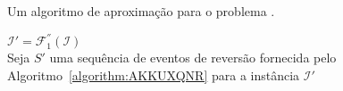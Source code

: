 \begin{algorithm}[!tbh]
  \caption{Um algoritmo de aproximação para o problema \SbFIR{}.\label{algorithm:BSOTINLZ}}
  $\mathcal{I}' = \mathcal{F}_{1}^{''}(\mathcal{I})$ \\
  Seja $S'$ uma sequência de eventos de reversão fornecida pelo Algoritmo~\ref{algorithm:AKKUXQNR} para a instância $\mathcal{I}'$ \\
\end{algorithm}